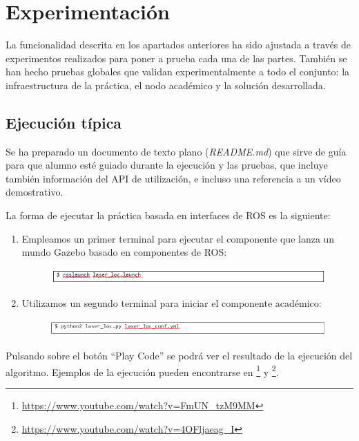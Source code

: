 \section{Experimentación}
La funcionalidad descrita en los apartados anteriores ha sido ajustada a través de experimentos realizados para poner a prueba cada una de las partes. También se han hecho pruebas globales que validan experimentalmente a todo el conjunto: la infraestructura de la práctica, el nodo académico y la solución desarrollada.

\subsection{Ejecución típica}
Se ha preparado un documento de texto plano (\textit{README.md}) que sirve de guía para que alumno esté guiado durante la ejecución y las pruebas, que incluye también información del API de utilización, e incluso una referencia a un vídeo demostrativo. 

La forma de ejecutar la práctica basada en interfaces de ROS es la siguiente:

\begin{enumerate}
	\item Empleamos un primer terminal para ejecutar el componente que lanza un mundo Gazebo basado en componentes de ROS:
	\begin{figure}[H]
		\begin{center}
			\includegraphics[width=0.95\linewidth]{figures/llcomando1.png}
			\label{fig.llcomando1}
		\end{center}
	\end{figure}
	\item Utilizamos un segundo terminal para iniciar el componente académico:
	\begin{figure}[H]
		\begin{center}
			\includegraphics[width=0.95\linewidth]{figures/llcomando2.png}
			\label{fig.llcomando2}
		\end{center}
	\end{figure}
\end{enumerate}

Pulsando sobre el botón “Play Code” se podrá ver el resultado de la ejecución del algoritmo. Ejemplos de la ejecución pueden encontrarse en \footnote{\url{https://www.youtube.com/watch?v=FmUN_tzM9MM}} y \footnote{\url{https://www.youtube.com/watch?v=4OFljaeag_I}}.


